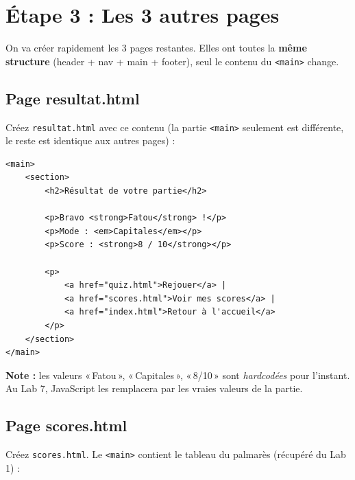 \documentclass[11pt,a4paper]{article}
\begin{document}
\newpage

\section{Étape 3 : Les 3 autres pages}

On va créer rapidement les 3 pages restantes. Elles ont toutes la \textbf{même
structure} (header + nav + main + footer), seul le contenu du \texttt{<main>}
change.

\subsection{Page resultat.html}

Créez \texttt{resultat.html} avec ce contenu (la partie \texttt{<main>}
seulement est différente, le reste est identique aux autres pages) :

\begin{lstlisting}[language=HTML5]
<main>
    <section>
        <h2>Résultat de votre partie</h2>

        <p>Bravo <strong>Fatou</strong> !</p>
        <p>Mode : <em>Capitales</em></p>
        <p>Score : <strong>8 / 10</strong></p>

        <p>
            <a href="quiz.html">Rejouer</a> |
            <a href="scores.html">Voir mes scores</a> |
            <a href="index.html">Retour à l'accueil</a>
        </p>
    </section>
</main>
\end{lstlisting}

\textbf{Note :} les valeurs «\,Fatou\,», «\,Capitales\,», «\,8/10\,» sont
\emph{hardcodées} pour l'instant. Au Lab 7, JavaScript les remplacera par
les vraies valeurs de la partie.

\subsection{Page scores.html}

Créez \texttt{scores.html}. Le \texttt{<main>} contient le tableau du
palmarès (récupéré du Lab 1) :
\end{document}
